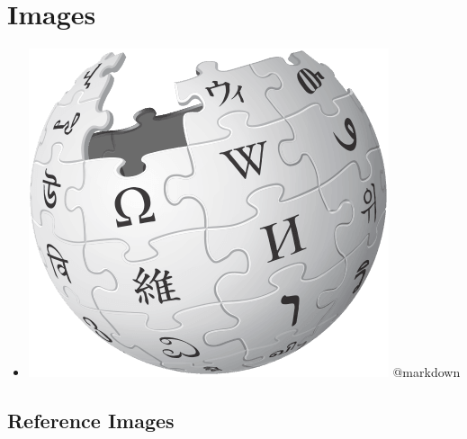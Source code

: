 \section{Images}
\label{images}

\begin{itemize}
\item \includegraphics[keepaspectratio,width=\textwidth,height=0.75\textheight]{image.png} @markdown

\end{itemize}

\subsection{Reference Images}
\label{referenceimages}

